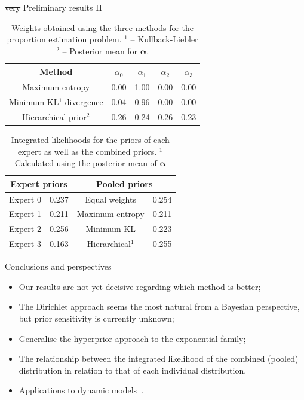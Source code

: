 \begin{frame}{\sout{very} Preliminary results II}
\begin{table}[ht]
\caption{Weights obtained using the three methods for the proportion estimation problem. $^1$ -- Kullback-Liebler $^2$ -- Posterior mean for $\boldsymbol\alpha$.}
\centering
\begin{tabular}{ccccc}
  \hline
Method  & $\alpha_0$ & $\alpha_1$ & $\alpha_2$ & $\alpha_3$ \\ 
  \hline
Maximum entropy & 0.00 & 1.00 & 0.00 & 0.00 \\ 
Minimum KL$^1$ divergence& 0.04 & 0.96 & 0.00 & 0.00 \\ 
Hierarchical prior$^2$ & 0.26 & 0.24 & 0.26 & 0.23 \\ 
   \hline
\end{tabular}
\end{table}
\begin{table}[ht]
\caption{Integrated likelihoods for the priors of each expert as well as the combined priors.
$^1$ Calculated using the posterior mean of $\boldsymbol\alpha$}
\centering
\begin{tabular}{cccc}
   \hline
   \multicolumn{2}{c}{Expert priors} &  \multicolumn{2}{c}{Pooled priors} \\
   \hline
   Expert 0 & 0.237 & Equal weights & 0.254\\
   Expert 1 & 0.211 & Maximum entropy & 0.211 \\
   Expert 2 & 0.256 & Minimum KL & 0.223\\ 
   Expert 3 & 0.163 & Hierarchical$^1$ & 0.255 \\
   \hline
\end{tabular}
\end{table}
\end{frame}
\begin{frame}{Conclusions and perspectives}
\begin{itemize}
 \item Our results are not yet decisive regarding which method is better;
 \item The Dirichlet approach seems the most natural from a Bayesian perspective, but prior sensitivity is currently unknown;
 \item Generalise the hyperprior approach to the exponential family;
 \item The relationship between the integrated likelihood of the combined (pooled) distribution in relation to that of each individual distribution.
 \item Applications to dynamic models~\citep{poole2000}.
\end{itemize}
\end{frame}
